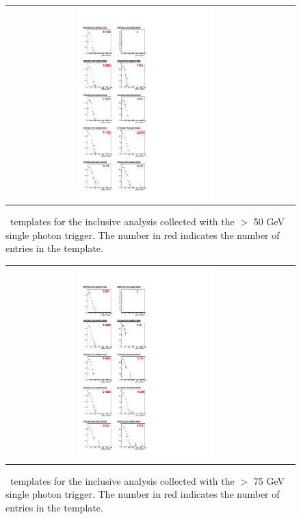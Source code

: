 \clearpage

\begin{figure}[!h]
\begin{center}
\begin{tabular}{cc}
\includegraphics[width=0.5\textwidth]{plots/template_inclusive_2.pdf}
\end{tabular}
\caption{
\MET\ templates for the inclusive analysis collected with the  \pt $>$ 50 GeV single photon trigger.
The number in red indicates the number of entries in the template.
}
\end{center}
\end{figure}

\clearpage

\begin{figure}[!h]
\begin{center}
\begin{tabular}{cc}
\includegraphics[width=0.5\textwidth]{plots/template_inclusive_3.pdf}
\end{tabular}
\caption{
\MET\ templates for the inclusive analysis collected with the  \pt $>$ 75 GeV single photon trigger.
The number in red indicates the number of entries in the template.
}
\end{center}
\end{figure}


